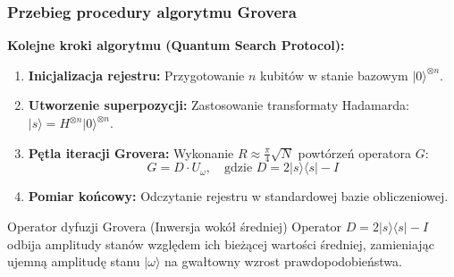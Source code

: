 \documentclass[aspectratio=169]{beamer}
\newcommand{\bra}[1]{\langle #1 \rvert}
\newcommand{\ket}[1]{\lvert #1 \rangle}
\begin{document}
\begin{frame}
    \frametitle{Przebieg procedury algorytmu Grovera}

    \textbf{Kolejne kroki algorytmu (Quantum Search Protocol):}
    \begin{enumerate}
        \item \textbf{Inicjalizacja rejestru:} Przygotowanie $n$ kubitów w stanie bazowym $\ket{0}^{\otimes n}$.
        \item \textbf{Utworzenie superpozycji:} Zastosowanie transformaty Hadamarda: $\ket{s} = H^{\otimes n}\ket{0}^{\otimes n}$.
        \item \textbf{Pętla iteracji Grovera:} Wykonanie $R \approx \frac{\pi}{4}\sqrt{N}$ powtórzeń operatora $G$:
        \begin{equation*}
            G = D \cdot U_\omega, \quad \text{gdzie } D = 2\ket{s}\bra{s} - I
        \end{equation*}
        \item \textbf{Pomiar końcowy:} Odczytanie rejestru w standardowej bazie obliczeniowej.
    \end{enumerate}

    \begin{block}{Operator dyfuzji Grovera (Inwersja wokół średniej)}
        Operator $D = 2\ket{s}\bra{s} - I$ odbija amplitudy stanów względem ich bieżącej wartości średniej, zamieniając ujemną amplitudę stanu $\ket{\omega}$ na gwałtowny wzrost prawdopodobieństwa.
    \end{block}
\end{frame}
\end{document}
